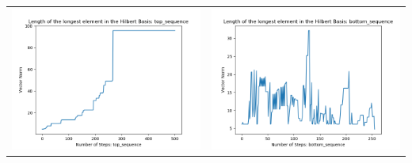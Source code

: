 \documentclass[10pt]{article}
\begin{document}
\begin{tabular}{c|c}
\begin{minipage}{.45\textwidth}
\includegraphics[width=\textwidth]{"DATA/4d/5 generators 2 bound J/top_sequence LENGTH"}
\end{minipage} &
\begin{minipage}{.45\textwidth}
\includegraphics[width=\textwidth]{"DATA/4d/5 generators 2 bound J bottomup/bottom_sequence LENGTH"}
\end{minipage}
\end{tabular}
\end{document}
